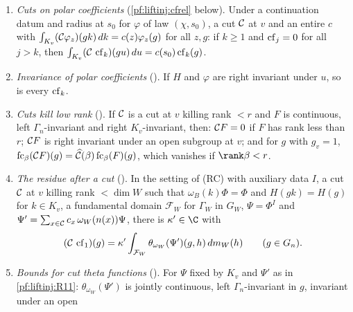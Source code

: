 \begin{enumerate}[label=(R\arabic*)]
$r\ge1$, $\chi$ $r$-adapted, and let $n(\cdot)$ be a unipotent coordinate. For every finite set $S$ there are a place $v\notin S$, a cut $\liftinjcut$
at $v$ killing rank $<r$ and an entire function $c$ with $c(t/2)\ne0$ such that for every Haar probability measure on $K_v$, every $z$ and every
continuous right $K_v$-invariant $f$ of law $(\chi,z)$: $\int_{K_v}(\liftinjcut f)(gk)\,dk=c(z)f(g)$.
\item\label{pf:liftinj:R8} \emph{Cuts on polar coefficients} (\cref{pf:liftinj:cfrel} below). Under a continuation datum and
radius at $s_0$ for $\varphi$ of law $(\chi,s_0)$, a cut $\liftinjcut$ at $v$ and an entire $c$ with
$\int_{K_v}(\mathcal{C}\varphi_z)(gk)\,dk=c(z)\varphi_z(g)$ for all $z,g$: if $k\ge1$ and $\operatorname{cf}_j=0$ for all $j>k$, then
$\int_{K_v}(\mathcal{C}\,\operatorname{cf}_k)(gu)\,du=c(s_0)\operatorname{cf}_k(g)$.
\item\label{pf:liftinj:R9} \emph{Invariance of polar coefficients} (). If $H$ and $\varphi$ are right
invariant under $u$, so is every $\operatorname{cf}_k$.
\item\label{pf:liftinj:R10} \emph{Cuts kill low rank} (). If $\liftinjcut$ is a cut at $v$ killing
rank $<r$ and $F$ is continuous, left $\Gamma_n$-invariant and right $K_v$-invariant, then: $\mathcal{C} F=0$ if $F$ has rank less than $r$;
$\mathcal{C} F$ is right invariant under an open subgroup at $v$; and for $g$ with $g_v=1$,
$\mathrm{fc}_\beta(\mathcal{C} F)(g)=\widehat{\mathcal{C}}(\beta)\,\mathrm{fc}_\beta(F)(g)$, which vanishes if $\rank\beta<r$.
\item\label{pf:liftinj:R11} \emph{The residue after a cut} (). In the setting of (RC) with auxiliary
data $I$, a cut $\liftinjcut$ at $v$ killing rank $<\dim W$ such that $\omega_B(k)\Phi=\Phi$ and $H(gk)=H(g)$ for $k\in K_v$, a fundamental domain
$\mathcal F_W$ for $\Gamma_W$ in $G_W$, $\Psi=\Phi^I$ and $\Psi'=\sum_{x\in\mathcal{C}}c_x\,\omega_W(n(x))\Psi$, there is $\kappa'\in\C$ with
\begin{equation}\label{eq:pf:liftinj:cutid}
(\mathcal{C}\,\operatorname{cf}_1)(g)=\kappa'\int_{\mathcal F_W}\theta_{\omega_W}(\Psi')(g,h)\,dm_W(h)\qquad(g\in G_n).
\end{equation}
\item\label{pf:liftinj:R12} \emph{Bounds for cut theta functions} (). For $\Psi$ fixed by $K_v$ and
$\Psi'$ as in \ref{pf:liftinj:R11}: $\theta_{\omega_W}(\Psi')$ is jointly continuous, left $\Gamma_n$-invariant in $g$, invariant under an open

\end{enumerate}

